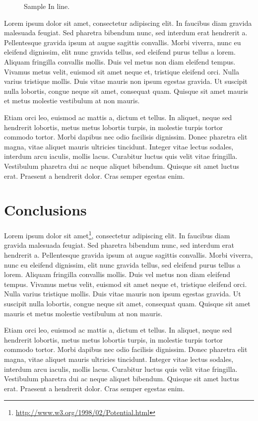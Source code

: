 \begin{wrapfigure}{l}{0.5\textwidth}
  \begin{center}
		{}
		\caption{Sample In line.}
	\end{center}
\label{fig:InlineSample}
\end{wrapfigure}

 Lorem ipsum dolor sit amet, consectetur adipiscing elit. In faucibus diam gravida malesuada feugiat. Sed pharetra bibendum nunc, sed interdum erat hendrerit a. Pellentesque gravida ipsum at augue sagittis convallis. Morbi viverra, nunc eu eleifend dignissim, elit nunc gravida tellus, sed eleifend purus tellus a lorem. Aliquam fringilla convallis mollis. Duis vel metus non diam eleifend tempus. Vivamus metus velit, euismod sit amet neque et, tristique eleifend orci. Nulla varius tristique mollis. Duis vitae mauris non ipsum egestas gravida. Ut suscipit nulla lobortis, congue neque sit amet, consequat quam. Quisque sit amet mauris et metus molestie vestibulum at non mauris.

Etiam orci leo, euismod ac mattis a, dictum et tellus. In aliquet, neque sed hendrerit lobortis, metus metus lobortis turpis, in molestie turpis tortor commodo tortor. Morbi dapibus nec odio facilisis dignissim. Donec pharetra elit magna, vitae aliquet mauris ultricies tincidunt. Integer vitae lectus sodales, interdum arcu iaculis, mollis lacus. Curabitur luctus quis velit vitae fringilla. Vestibulum pharetra dui ac neque aliquet bibendum. Quisque sit amet luctus erat. Praesent a hendrerit dolor. Cras semper egestas enim.


\section{Conclusions}

Lorem ipsum dolor sit amet\footnote{\url{http://www.w3.org/1998/02/Potential.html}}, consectetur adipiscing elit. In faucibus diam gravida malesuada feugiat. Sed pharetra bibendum nunc, sed interdum erat hendrerit a. Pellentesque gravida ipsum at augue sagittis convallis. Morbi viverra, nunc eu eleifend dignissim, elit nunc gravida tellus, sed eleifend purus tellus a lorem. Aliquam fringilla convallis mollis. Duis vel metus non diam eleifend tempus. Vivamus metus velit, euismod sit amet neque et, tristique eleifend orci. Nulla varius tristique mollis. Duis vitae mauris non ipsum egestas gravida. Ut suscipit nulla lobortis, congue neque sit amet, consequat quam. Quisque sit amet mauris et metus molestie vestibulum at non mauris.

Etiam orci leo, euismod ac mattis a, dictum et tellus. In aliquet, neque sed hendrerit lobortis, metus metus lobortis turpis, in molestie turpis tortor commodo tortor. Morbi dapibus nec odio facilisis dignissim. Donec pharetra elit magna, vitae aliquet mauris ultricies tincidunt. Integer vitae lectus sodales, interdum arcu iaculis, mollis lacus. Curabitur luctus quis velit vitae fringilla. Vestibulum pharetra dui ac neque aliquet bibendum. Quisque sit amet luctus erat. Praesent a hendrerit dolor. Cras semper egestas enim.
